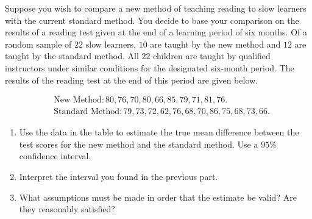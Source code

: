
\begin{exercise}

Suppose you wish to compare a new method of teaching reading to slow learners with the current standard method.
You decide to base your comparison on the results of a reading test given at the end of a learning period of six months.
Of a random sample of $22$ slow learners, $10$ are taught by the new method and $12$ are taught by the standard method.
All $22$ children are taught by qualified instructors under similar conditions for the designated six-month period.
The results of the reading test at the end of this period are given below.

\begin{align*}
    & \text{New Method}: 80, 76, 70, 80, 66, 85, 79, 71, 81, 76. \\
    & \text{Standard Method}: 79, 73, 72, 62, 76, 68, 70, 86, 75, 68, 73, 66.
\end{align*}

\begin{enumerate}[label = (\alph*)]

    \item Use the data in the table to estimate the true mean difference between the test scores for the new method and the standard method.
    Use a $95 \%$ confidence interval.

    \item Interpret the interval you found in the previous part.

    \item What assumptions must be made in order that the estimate be valid? Are they reasonably satisfied?

\end{enumerate}

\end{exercise}


\begin{solution}

\phantom{}

\end{solution}

